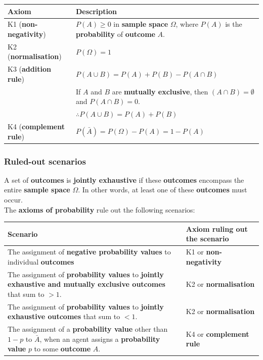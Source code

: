 \documentclass[11pt]{article}
\begin{document}
\begin{center}
\begin{tabularx}{\textwidth}{|X|X|}
\hline
Axiom & Description\\
\hline
K1 (\textbf{non-negativity}) & \(P(A) \ge 0\) in \textbf{sample space} \(\Omega\), where \(P(A)\) is the \textbf{probability} of \textbf{outcome} \(A\).\\
\hline
K2 (\textbf{normalisation}) & \(P(\Omega) = 1\)\\
\hline
K3 (\textbf{addition rule}) & \(P (A \cup B) = P(A) + P(B) - P(A \cap B)\)\\
 & If \(A\) and \(B\) are \textbf{mutually exclusive}, then \((A \cap B) = \emptyset\) and \(P(A \cap B) = 0\).\\
 & \(\therefore P(A \cup B) = P(A) + P(B)\)\\
\hline
K4 (\textbf{complement rule}) & \(P(\bar{A}) = P(\Omega) - P(A) = 1 - P(A)\)\\
\hline
\end{tabularx}
\end{center}
\subsubsection{Ruled-out scenarios}
\label{sec:org5bf9c07}
A set of \textbf{outcomes} is \textbf{jointly exhaustive} if these \textbf{outcomes} encompass the entire \textbf{sample space} \(\Omega\). In other words, at least one of these \textbf{outcomes} must occur.  \\

The \textbf{axioms of probability} rule out the following scenarios:
\begin{center}
\begin{tabularx}{\textwidth}{|X|X|}
\hline
Scenario & Axiom ruling out the scenario\\
\hline
The assignment of \textbf{negative probability values} to individual \textbf{outcomes} & K1 or \textbf{non-negativity}\\
\hline
The assignment of \textbf{probability values} to \textbf{jointly exhaustive and mutually exclusive outcomes} that sum to \(> 1\). & K2 or \textbf{normalisation}\\
\hline
The assignment of \textbf{probability values} to \textbf{jointly exhaustive outcomes} that sum to \(< 1\). & K2 or \textbf{normalisation}\\
\hline
The assignment of a \textbf{probability value} other than \(1 - p\) to \(\bar{A}\), when an agent assigns a \textbf{probability value} \(p\) to some \textbf{outcome} \(A\). & K4 or \textbf{complement rule}\\
\hline
\end{tabularx}
\end{center}
\end{document}
